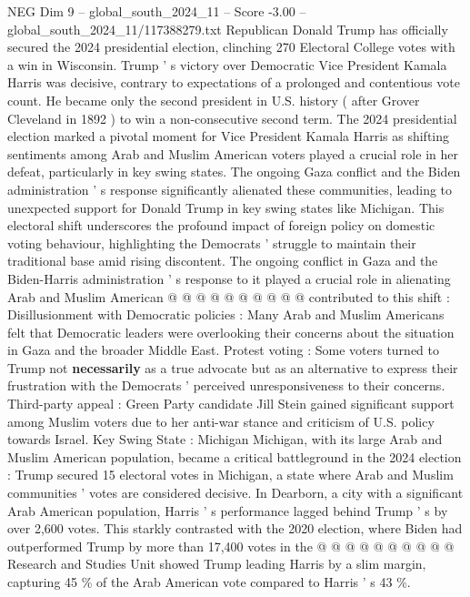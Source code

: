 \begin{textsample}{NEG Dim 9 – global\_south\_2024\_11 – Score -3.00 – global\_south\_2024\_11/117388279.txt}  \label{ex:f9_neg_306}
Republican Donald Trump has officially secured the 2024 presidential election, clinching 270 Electoral College votes with a win in Wisconsin.
Trump ' s victory over Democratic Vice President Kamala Harris was decisive, contrary to expectations of a prolonged and contentious vote count.
He became only the second president in U.S. history ( after Grover Cleveland in 1892 ) to win a non-consecutive second term.
The 2024 presidential election marked a pivotal moment for Vice President Kamala Harris as shifting sentiments among Arab and Muslim American voters played a crucial role in her defeat, particularly in key swing states.
The ongoing Gaza conflict and the Biden administration ' s response significantly alienated these communities, leading to unexpected support for Donald Trump in key swing states like Michigan.
This electoral shift underscores the profound impact of foreign policy on domestic voting behaviour, highlighting the Democrats ' struggle to maintain their traditional base amid rising discontent.
The ongoing conflict in Gaza and the Biden-Harris administration ' s response to it played a crucial role in alienating Arab and Muslim American @ @ @ @ @ @ @ @ @ @ contributed to this shift : Disillusionment with Democratic policies : Many Arab and Muslim Americans felt that Democratic leaders were overlooking their concerns about the situation in Gaza and the broader Middle East.
Protest voting : Some voters turned to Trump not \textbf{necessarily} as a true advocate but as an alternative to express their frustration with the Democrats ' perceived unresponsiveness to their concerns.
Third-party appeal : Green Party candidate Jill Stein gained significant support among Muslim voters due to her anti-war stance and criticism of U.S. policy towards Israel.
Key Swing State : Michigan Michigan, with its large Arab and Muslim American population, became a critical battleground in the 2024 election : Trump secured 15 electoral votes in Michigan, a state where Arab and Muslim communities ' votes are considered decisive.
In Dearborn, a city with a significant Arab American population, Harris ' s performance lagged behind Trump ' s by over 2,600 votes.
This starkly contrasted with the 2020 election, where Biden had outperformed Trump by more than 17,400 votes in the @ @ @ @ @ @ @ @ @ @ Research and Studies Unit showed Trump leading Harris by a slim margin, capturing 45 \% of the Arab American vote compared to Harris ' s 43 \%.

\end{textsample}
